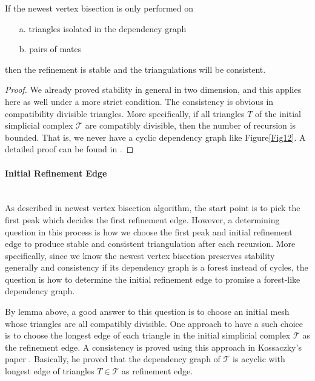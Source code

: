     \begin{lemma*}
    If the newest vertex bisection is only performed on 
    \begin{itemize}
        \item[a. ] triangles isolated in the dependency graph
        \item[b. ] pairs of mates
      \end{itemize}
    then the refinement is stable and the triangulations will be consistent.
    \end{lemma*}
    \begin{proof}
    We already proved stability in general in two dimension, and this applies here as well under a more strict condition. The consistency is obvious in compatibility divisible triangles. More specifically, if all triangles $T$ of the initial simplicial complex $\mathcal T$ are compatibly divisible, then the number of recursion is bounded. That is, we never have a cyclic dependency graph like Figure\ref{Fig12}. A detailed proof can be found in \cite{mitchell1988unified, mitchell1991adaptive}.
    \end{proof}

    \paragraph{Initial Refinement Edge}\mbox{}\\
    As described in newest vertex bisection algorithm, the start point is to pick the first peak which decides the first refinement edge. However, a determining question in this process is how we choose the first peak and initial refinement edge to produce stable and consistent triangulation after each recursion. More specifically, since we know the newest vertex bisection preserves stability generally and consistency if its dependency graph is a forest instead of cycles, the question is how to determine the initial refinement edge to promise a forest-like dependency graph. 

    By lemma above, a good answer to this question is to choose an initial mesh whose triangles are all compatibly divisible. One approach to have a such choice is to choose the longest edge of each triangle in the initial simplicial complex $\mathcal T$ as the refinement edge. A consistency is proved using this approach in Kossaczky's paper \cite{kossaczky1994recursive}. Basically, he proved that the dependency graph of $\mathcal T$ is acyclic with longest edge of triangles $T\in\mathcal T$ as refinement edge.

